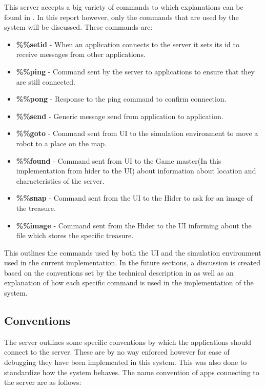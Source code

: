     This server accepts a big variety of commands to which explanations can be found in \cite{technical}. In this report however, only the commands that are used by the system will be discussed. These commands are:

      \begin{itemize}
        \item \textbf{\%\%setid} - When an application connects to the server it sets its id to receive messages from other applications.
        \item \textbf{\%\%ping} - Command sent by the server to applications to ensure that they are still connected.
        \item \textbf{\%\%pong} - Response to the ping command to confirm connection.
        \item \textbf{\%\%send} - Generic message send from application to application.
        \item \textbf{\%\%goto} - Command sent from UI to the simulation environment to move a robot to a place on the map.
        \item \textbf{\%\%found} - Command sent from UI to the Game master(In this implementation from hider to the UI) about information about location and characteristics of the server.
        \item \textbf{\%\%snap} - Command sent from the UI to the Hider to ask for an image of the treasure.
        \item \textbf{\%\%image} - Command sent from the Hider to the UI informing about the file which stores the specific treasure.
      \end{itemize}

    This outlines the commands used by both the UI and the simulation environment used in the current implementation. In the future sections, a discussion is created based on the conventions set by the technical description in \cite{technical} as well as an explanation of how each specific command is used in the implementation of the system.

    \subsection{Conventions}
      The server outlines some specific conventions by which the applications should connect to the server. These are by no way enforced however for ease of debugging they have been implemented in this system. This was also done to standardize how the system behaves. The name convention of apps connecting to the server are as follows:

